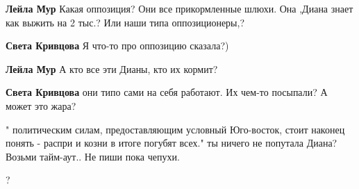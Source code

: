 \begin{itemize}
\begin{itemize}
\textbf{Лейла Мур} Какая оппозиция? Они все прикормленные шлюхи. Она ,Диана знает как выжить на 2 тыс.? Или наши типа оппозиционеры,?

 
\textbf{Света Кривцова} Я что-то про оппозицию сказала?)

 
\textbf{Лейла Мур} А кто все эти Дианы, кто их кормит?

 
\textbf{Света Кривцова} они типо сами на себя работают. Их чем-то посыпали? А может это жара?
\end{itemize}

 

" политическим силам, предоставляющим условный Юго-восток, стоит наконец понять
- распри и козни в итоге погубят всех." ты ничего не попутала Диана? Возьми
тайм-аут.. Не пиши пока чепухи.


 
?

 


\end{itemize}
